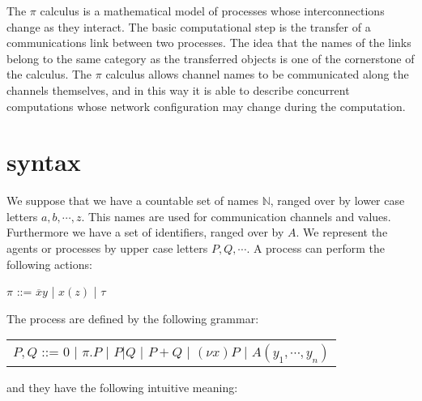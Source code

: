 
The $\pi$ calculus is a mathematical model of processes whose interconnections change as they interact. The basic computational step is the transfer of a communications link between two processes. The idea that the names of the links belong to the same category as the transferred objects is one of the cornerstone of the calculus. The $\pi$ calculus allows channel names to be communicated along the channels themselves, and in this way it is able to describe concurrent computations whose network configuration may change during the computation.


\section{syntax}
We suppose that we have a countable set of names $\mathbb{N}$, ranged over by lower case letters $a,b, \cdots, z$. This names are used for communication channels and values. Furthermore we have a set of identifiers, ranged over by $A$. We represent the agents or processes by upper case letters $P,Q, \cdots $. A process can perform the following actions:
\begin{center}
  $\pi$ ::= $\overline{x}y$ | $x(z)$ | $\tau$ 
\end{center}
The process are defined by the following grammar:
\begin{center}
  \begin{tabular}{l}
    $P,Q$ ::= $0$ | $\pi.P$ | $P|Q$ | $P+Q$ | $(\nu x) P$ | $A(y_{1}, \cdots, y_{n})$ 
  \end{tabular}
\end{center}
and they have the following intuitive meaning:
